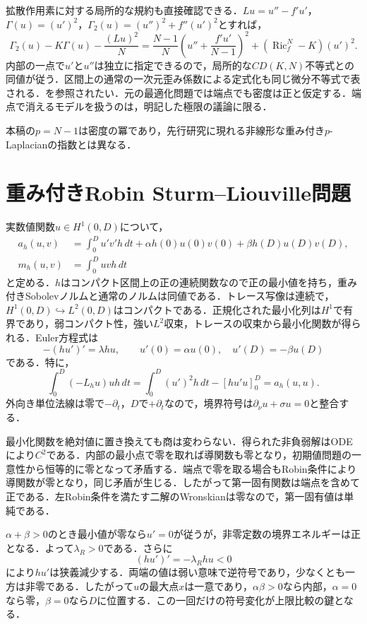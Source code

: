 \documentclass[12pt]{amsart}
\theoremstyle{definition}
\theoremstyle{remark}
\numberwithin{equation}{section}
\DeclareMathOperator{\Ric}{Ric}
\begin{document}
拡散作用素に対する局所的な規約も直接確認できる．$Lu=u''-f'u'$，
$\Gamma(u)=(u')^2$，$\Gamma_2(u)=(u'')^2+f''(u')^2$とすれば，
\[
 \Gamma_2(u)-K\Gamma(u)-\frac{(Lu)^2}{N}
 =\frac{N-1}{N}\left(u''+\frac{f'u'}{N-1}\right)^2
 +(\Ric_f^N-K)(u')^2.
\]
内部の一点で$u'$と$u''$は独立に指定できるので，局所的な$CD(K,N)$不等式との同値が従う．区間上の通常の一次元歪み係数による定式化も同じ微分不等式で表される．\cite[\S4.1, 式(4-4)]{CM}を参照されたい．元の最適化問題では端点でも密度は正と仮定する．端点で消えるモデルを扱うのは，明記した極限の議論に限る．

本稿の$p=N-1$は密度の冪であり，先行研究に現れる非線形な重み付き$p$-Laplacianの指数とは異なる．

\section{重み付きRobin Sturm--Liouville問題}
実数値関数$u\in H^1(0,D)$について，
\begin{align*}
 a_h(u,v)&=\int_0^D u'v'h\,dt+\alpha h(0)u(0)v(0)+\beta h(D)u(D)v(D),\\
 m_h(u,v)&=\int_0^D uvh\,dt
\end{align*}
と定める．$h$はコンパクト区間上の正の連続関数なので正の最小値を持ち，重み付きSobolevノルムと通常のノルムは同値である．トレース写像は連続で，$H^1(0,D)\hookrightarrow L^2(0,D)$はコンパクトである．正規化された最小化列は$H^1$で有界であり，弱コンパクト性，強い$L^2$収束，トレースの収束から最小化関数が得られる．Euler方程式は
\[
 -(hu')'=\lambda hu,\qquad u'(0)=\alpha u(0),\quad u'(D)=-\beta u(D)
\]
である．特に，
\[
 \int_0^D(-L_hu)u h\,dt
 =\int_0^D(u')^2h\,dt-[hu'u]_0^D=a_h(u,u).
\]
外向き単位法線は零で$-\partial_t$，$D$で$+\partial_t$なので，境界符号は$\partial_\nu u+\sigma u=0$と整合する．

最小化関数を絶対値に置き換えても商は変わらない．得られた非負弱解はODEにより$C^2$である．内部の最小点で零を取れば導関数も零となり，初期値問題の一意性から恒等的に零となって矛盾する．端点で零を取る場合もRobin条件により導関数が零となり，同じ矛盾が生じる．したがって第一固有関数は端点を含めて正である．左Robin条件を満たす二解のWronskianは零なので，第一固有値は単純である．

$\alpha+\beta>0$のとき最小値が零なら$u'=0$が従うが，非零定数の境界エネルギーは正となる．よって$\lambda_R>0$である．さらに
\begin{equation}\label{ja:flux}
 (hu')'=-\lambda_Rhu<0
\end{equation}
により$hu'$は狭義減少する．両端の値は弱い意味で逆符号であり，少なくとも一方は非零である．したがって$u$の最大点$x$は一意であり，$\alpha\beta>0$なら内部，$\alpha=0$なら零，$\beta=0$なら$D$に位置する．この一回だけの符号変化が上限比較の鍵となる．
\end{document}
